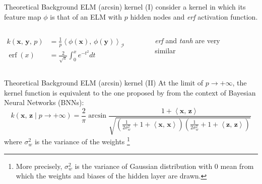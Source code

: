 \documentclass[aspectratio=169]{beamer}
\DeclareMathOperator{\erf}{erf}
\newcommand{\z}{{\boldsymbol{z}}}
\begin{document}
\begin{frame}{Theoretical Background \textendash{} ELM (arcsin) kernel (I)}
	\textcite{frenayParameterinsensitiveKernelExtreme2011} consider a kernel
	in which its feature map $\phi$ is that of an ELM with $p$ hidden nodes and \emph{erf} activation function.
	\begin{columns}
		\begin{column}{0.4\textwidth}
			\begin{align*}
				k(\boldsymbol x,\, \boldsymbol y,\,p) & = \frac{1}{p} \left\langle \phi(\boldsymbol x),\, \phi(\boldsymbol y) \right\rangle_{\mathcal{H}} \\[1em]
				\erf(x)                               & = \frac{2}{\sqrt{\pi}} \int_{0}^{x} e^{-t^2} dt
			\end{align*}
		\end{column}
		\begin{column}{0.6\textwidth}
			\begin{figure}[H]
				\caption{\emph{erf} and \emph{tanh} are very similar}
			\end{figure}
		\end{column}
	\end{columns}
\end{frame}

\begin{frame}{Theoretical Background \textendash{} ELM (arcsin) kernel (II)}
	At the limit of $p \to + \infty$, the kernel function is equivalent to the one
	proposed by \textcite{williamsComputingInfiniteNetworks1996} from the context of
	Bayesian Neural Networks (BNNs):
	\begin{equation}
		k(\boldsymbol x,\,\z \mid p \to + \infty)  = \frac{2}{\pi}
		\arcsin \frac{1 + \left\langle \boldsymbol x,\,\z \right\rangle}{\sqrt{
				\left(
				\frac{1}{2\sigma_w^2} + 1 + \left\langle \boldsymbol x,\,\boldsymbol x \right\rangle
				\right)
				\left(
				\frac{1}{2\sigma_w^2} + 1 + \left\langle \z,\,\z \right\rangle
				\right)
			}}
	\end{equation}
	where $\sigma_w^2$ is the variance of the weights \footnote{
		More precisely, $\sigma_w^2$ is the variance of Gaussian distribution with 0 mean from which the weights and biases of the
		hidden layer are drawn.
	}
\end{frame}
\end{document}
